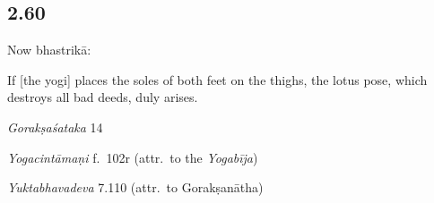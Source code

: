 \begin{ekdosis}
\subsection*{2.60}
\begin{translation}[hp02_060]
Now bhastrikā:

If [the yogi] places the soles of both feet on the thighs, the lotus pose, which destroys all bad deeds, duly arises.
\end{translation}

\begin{sources}[hp02_060]
\emph{Gorakṣaśataka} 14

\begin{versinnote}
\end{versinnote}
\end{sources}

\begin{testimonia}[hp02_060]

\emph{Yogacintāmaṇi} f.~102r (attr.~to the \emph{Yogabīja})

\begin{versinnote}
\end{versinnote}

\emph{Yuktabhavadeva} 7.110 (attr.~to Gorakṣanātha)

\begin{versinnote}
\end{versinnote}
\end{testimonia}


\end{ekdosis}
